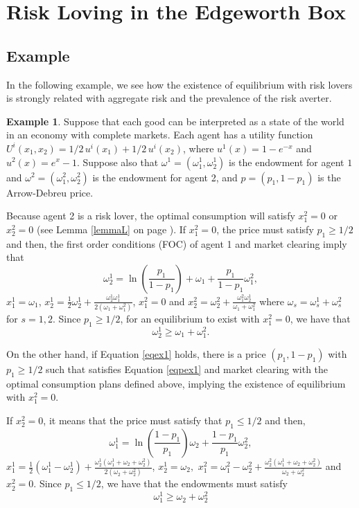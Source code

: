 \documentclass[pdftex]{article}
\numberwithin{equation}{section}
\theoremstyle{th}
\newtheorem{proof lemma}{{Proof Lemma}.}
\theoremstyle{definition}
\newtheorem{example}{Example}%
\begin{document}
\section{Risk Loving in the Edgeworth Box}\label{section1}
\subsection{Example}
In the following example, we see how the existence of equilibrium with risk lovers is strongly related with aggregate risk and the prevalence of the risk averter.

\begin{example}
\label{ex-1}
Suppose that each good can be interpreted as a state of the world in an economy with complete markets. Each agent has a utility function $U^i\left(x_1,x_2\right)=1/2\,u^i\left(x_1\right)+1/2\,u^i(x_2)$, where $u^1(x)=1-e^{-x}$ and $u^2(x)=e^x-1$. Suppose also that $\omega^1=\left(\omega^1_1,\omega_2^1\right)$ is the endowment for agent $1$ and $\omega^2=\left(\omega^2_1,\omega^2_2\right)$ is the endowment for agent 2, and $p=(p_1,1-p_1)$ is the Arrow-Debreu price.

Because agent 2 is a risk lover, the optimal consumption will satisfy $x^2_1=0$ or $x^2_2=0$ (see Lemma \ref{lemmaL} on page \pageref{lemmaL}). %
If $x^2_1=0$, the price must satisfy $p_1\geq1/2$ and then, the first order conditions (FOC) of agent 1 and market clearing imply that \begin{equation}\label{eqpex1} \omega_2^1=\ln\left(\frac{p_1}{1-p_1}\right)+\omega_1+\frac{p_1}{1-p_1}\omega_1^2,\end{equation} $x^1_1=\omega_1$, $x^1_2=\frac{1}{2}\omega^1_2+\frac{\omega_2^1\omega_1^1}{2\left(\omega_1+\omega_1^2\right)}$, $x^2_1=0$ and $x^2_2=\omega_2^2+\frac{\omega_1^2\omega^1_2}{\omega_1+\omega_1^2}$ where $\omega_s=\omega^1_s+\omega^2_s$ for $s=1,2$. Since $p_1\geq1/2$, for an equilibrium to exist with $x^2_1=0$, we have that \begin{equation}\label{eqex1}\omega_2^1\geq\omega_1+\omega^2_1.\end{equation}

On the other hand, if Equation \ref{eqex1} holds, there is a price $(p_1,1-p_1)$ with $p_1\geq1/2$ such that satisfies Equation \ref{eqpex1} and market clearing with the optimal consumption plans defined above, implying the existence of equilibrium with $x^2_1=0$.

If $x^2_2=0$, it means that the price must satisfy that $p_1\leq1/2$ and then, \begin{equation}\label{eqpex}\omega^1_1=\ln\left(\frac{1-p_1}{p_1}\right)\omega_2+\frac{1-p_1}{p_1}\omega_2^2,\end{equation} $x^1_1=\frac{1}{2}\left(\omega^1_1-\omega_2^1\right)+\frac{\omega_2^1\left(\omega_1^1+\omega_2+\omega_2^2\right)}{2\left(\omega_2+\omega_2^2\right)}$, $x^1_2=\omega_2,$ 
 $x^2_1=\omega_1^2-\omega_2^2+\frac{\omega_2^2\left(\omega_1^1+\omega_2+\omega_2^2\right)}{\omega_2+\omega_2^2}$ and $x^2_2=0$. Since $p_1\leq1/2$, we have that the endowments must satisfy\begin{equation}\label{eqex}
\omega_1^1\geq\omega_2+\omega^2_2\end{equation}


\end{example}
\end{document}
